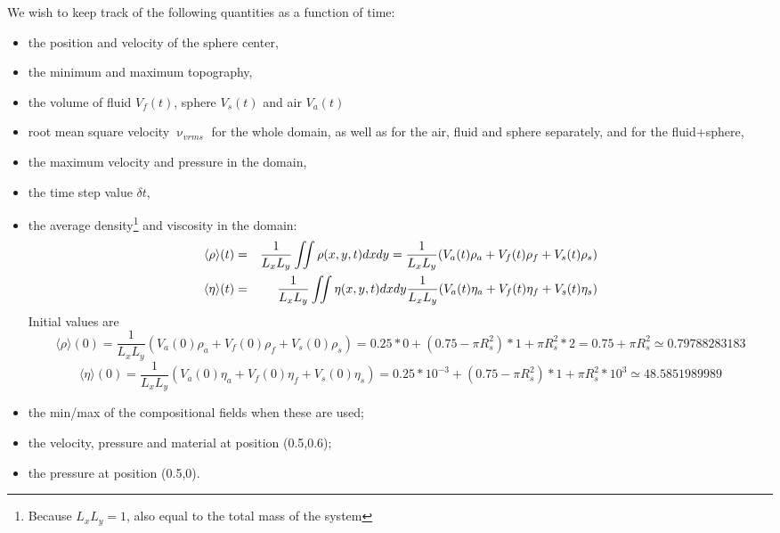 We wish to keep track of the following quantities as a function of time:
\begin{itemize}
\item the position and velocity of the sphere center,
\item the minimum and maximum topography,
\item the volume of fluid $V_f(t)$, sphere $V_s(t)$ and air $V_a(t)$
\item root mean square velocity $\upnu_{vrms}$ for the whole domain, as well as for the air, fluid and sphere 
      separately, and for the fluid+sphere,
\item the maximum velocity and pressure in the domain,
\item the time step value $\delta t$,
\item the average density\footnote{Because $L_xL_y=1$, also equal to the total mass of the system} and viscosity in the domain:
\begin{eqnarray}
\langle \rho \rangle (t) &=& \frac{1}{L_xL_y} \iint \rho(x,y,t) dx dy
= \frac{1}{L_xL_y} ( V_a(t)\rho_a + V_f(t)\rho_f + V_s(t)\rho_s )  \nonumber\\
\langle \eta \rangle (t) &=& \frac{1}{L_xL_y} \iint \eta(x,y,t) dx dy
\frac{1}{L_xL_y} ( V_a(t) \eta_a + V_f(t)\eta_f  + V_s(t)\eta_s ) 
\end{eqnarray}
Initial values are 
\[
\langle \rho \rangle (0) = \frac{1}{L_xL_y} ( V_a(0)\rho_a + V_f(0)\rho_f + V_s(0)\rho_s )  
= 0.25*0 + (0.75-\pi R_s^2)*1 + \pi R_s^2* 2 = 0.75 + \pi R_s^2  \simeq 0.79788283183
\]
\[
\langle \eta \rangle (0) = \frac{1}{L_xL_y} ( V_a(0)\eta_a + V_f(0)\eta_f + V_s(0)\eta_s )  
= 0.25*10^{-3} + (0.75-\pi R_s^2)*1 + \pi R_s^2* 10^3   \simeq 48.5851989989
\]



\item the min/max of the compositional fields when these are used;
\item the velocity, pressure and material at position (0.5,0.6);
\item the pressure at position (0.5,0).
\end{itemize}

